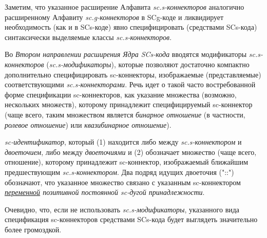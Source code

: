 Заметим, что указанное расширение Алфавита \textit{sc.s-коннекторов} аналогично расширенному Алфавиту \textit{sc.g-коннекторов} в SCg-коде и ликвидирует необходимость (как и в SCs-коде) явно специфицировать (средствами SCs-кода) синтаксически выделяемые классы \textit{sc.s-коннекторов}.

\begin{SCn}
\end{SCn}

Во \textit{Втором направлении расширения Ядра SCs-кода} вводятся модификаторы \textit{sc.s-коннекторов} (\textit{\mbox{sc.s-модификаторы}}), которые позволяют достаточно компактно дополнительно специфицировать \mbox{sc-коннекторы}, изображаемые (представляемые) соответствующими \textit{sc.s-коннекторами}. Речь идет о такой часто востребованной форме спецификации sc-коннекторов, как указание множества (возможно, нескольких множеств), которому принадлежит специфицируемый  sc-коннектор (чаще всего, таким множеством является \textit{бинарное отношение} (в частности, \textit{ролевое отношение}) или \textit{квазибинарное отношение}).

\begin{SCn}
\begin{scnindent}
\end{scnindent}	
\textit{sc-идентификатор}, который (1) находится либо между \textit{sc.s-коннектором} и \textit{двоеточием}, либо между \textit{двоеточиями} и (2) обозначает множество (чаще всего, отношение), которому принадлежит sc-коннектор, изображаемый ближайшим предшествующим \textit{sc.s-коннектором}. Два подряд идущих двоеточия ("::") обозначают, что указанное множество связано с указанным sc-коннектором \textit{\uline{переменной} позитивной постоянной sc-дугой принадлежности}.
\end{SCn}


Очевидно, что, если не использовать \textit{sc.s-модификаторы}, указанного вида спецификация sc-коннекторов средствами SCs-кода будет выглядеть значительно более громоздкой.

\begin{SCn}
\end{SCn}

